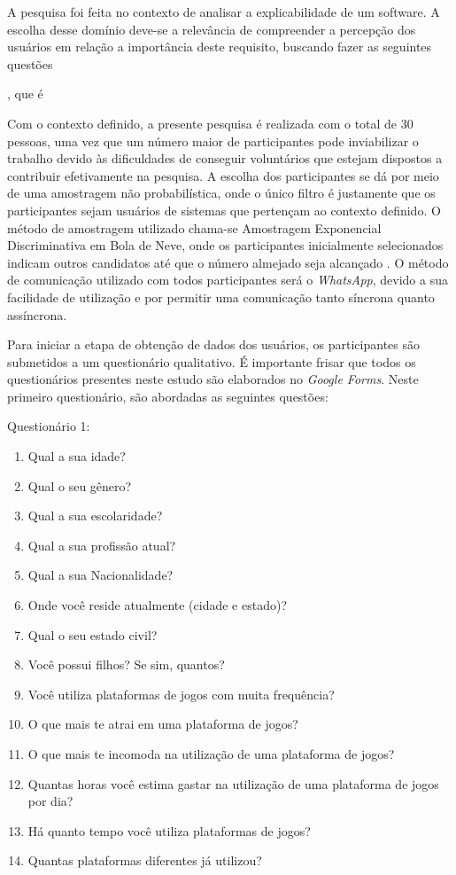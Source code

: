 \documentclass[12pt]{article}
\begin{document}
\par A pesquisa foi feita no contexto de analisar a explicabilidade de um software. A escolha desse domínio deve-se a relevância de compreender a percepção dos usuários em relação a importância deste requisito, buscando fazer as seguintes questões
\begin{enumerate*}
    \item 
\end{enumerate*}
, que é 

\par Com o contexto definido, a presente pesquisa é realizada com o total de 30 pessoas, uma vez que um número maior de participantes pode inviabilizar o trabalho devido às dificuldades de conseguir voluntários que estejam dispostos a contribuir efetivamente na pesquisa. A escolha dos participantes se dá por meio de uma amostragem não probabilística, onde o único filtro é justamente que os participantes sejam usuários de sistemas que pertençam ao contexto definido. O método de amostragem utilizado chama-se Amostragem Exponencial Discriminativa em Bola de Neve, onde os participantes inicialmente selecionados indicam outros candidatos até que o número almejado seja alcançado \cite{snow_ball_prob}. O método de comunicação utilizado com todos participantes será o \emph{WhatsApp}, devido a sua facilidade de utilização e por permitir uma comunicação tanto síncrona quanto assíncrona.
       
\par Para iniciar a etapa de obtenção de dados dos usuários, os participantes são submetidos a um questionário qualitativo. É importante frisar que todos os questionários presentes neste estudo são elaborados no \emph{Google Forms}. Neste primeiro questionário, são abordadas as seguintes questões:
\par Questionário 1:
\begin{enumerate}\setlength\itemsep{0.5em}
    \item Qual a sua idade?
    \item Qual o seu gênero?
    \item Qual a sua escolaridade?
    \item Qual a sua profissão atual?
    \item Qual a sua Nacionalidade?
    \item Onde você reside atualmente (cidade e estado)? 
    \item Qual o seu estado civil?
    \item Você possui filhos? Se sim, quantos?
    \item Você utiliza plataformas de jogos com muita frequência?
    \item O que mais te atrai em uma plataforma de jogos?
    \item O que mais te incomoda na utilização de uma plataforma de jogos?
    \item Quantas horas você estima gastar na utilização de uma plataforma de jogos por dia?
    \item Há quanto tempo você utiliza plataformas de jogos?
    \item Quantas plataformas diferentes já utilizou?
\end{enumerate}
       
\end{document}
